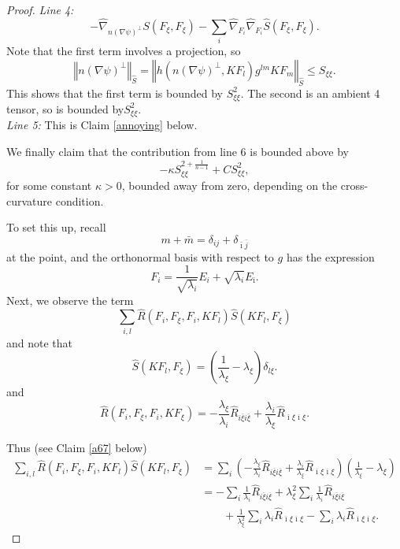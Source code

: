 \documentclass[10pt,a4paper]{amsart}
\newcommand{\maxidx}{\mathord{\xi}} %
\begin{document}
\begin{proof}
\textit{Line 4:}
\[
-\hat{\nabla}_{n\left(  \nabla\psi\right)  ^{\perp}}
S(F_{\maxidx},F_{\maxidx})
-\sum_{i}\hat{\nabla}_{F_{i}}\hat{\nabla}_{F_{i}}\hat{S}(F_{\maxidx},F_{\maxidx}).
\]
Note that the first term involves a projection, so
\[
\left\Vert n\left(  \nabla\psi\right)  ^{\perp}\right\Vert _{\hat{S}}
=\left\Vert
h(n\left(  \nabla\psi\right)  ^{\perp},KF_{l})g^{lm}KF_{m}\right\Vert_{\hat{S}} 
\leq S_{\maxidx\maxidx}.
\]
This shows that the first term is bounded by $S_{\maxidx\maxidx}^{2}.$ 
The second is an ambient 4 tensor, so is bounded by$S_{\maxidx\maxidx}^{2}.$\\

\textit{Line 5:} This is Claim \ref{annoying} below.

We finally claim that the contribution from line 6 is bounded above by
\[
-\kappa S_{\maxidx\maxidx}^{2+\frac{1}{n-1}} + C S_{\maxidx\maxidx}^{2},
\]
for some constant $\kappa>0$, bounded away from zero, 
depending on the cross-curvature condition.

To set this up, recall
\[
m+\bar{m}=\delta_{ij}+\delta_{\bar{\imath}
\bar{j}}
\]
at the point, and the orthonormal basis with respect to $g$ has the
expression
\[
F_i=\frac{1}{\sqrt{\lambda_{i}}}E_{i}
  +\sqrt{\lambda_{i}}E_{\bar{\imath}}.
\]
Next, we observe the term
\[
\sum_{i,l}\hat{R}(F_{i},F_{\maxidx},F_{i},KF_{l})\hat{S}(KF_{l},F_{\maxidx})
\]
and note that
\[
\hat{S}(KF_{l},F_{\maxidx})
=\left(  \frac{1}{\lambda_{\maxidx}}-\lambda_{\maxidx}\right)\delta_{l\maxidx}.
\]
and 
\[
\hat{R}(F_{i},F_{\maxidx},F_{i},KF_{\maxidx})
=-\frac{\lambda_{\maxidx}}{\lambda_{i}}\hat{R}_{i\overline{\maxidx} i\overline{\maxidx}}
+\frac{\lambda_{i}}{\lambda_{\maxidx}}\hat{R}_{\overline{\imath}\maxidx\overline{\imath}\maxidx}.
\]

Thus (see Claim \ref{a67} below) 
\begin{align*}
\sum_{i,l}\hat{R}(F_{i},F_{\maxidx},F_{i},KF_{l})\hat{S}(KF_{l},F_{\maxidx})
&=\sum_{i}\left(
  -\frac{\lambda_{\maxidx}}{\lambda_{i}}\hat{R}_{i\overline{\maxidx}i\overline{\maxidx}}
  +\frac{\lambda_{i}}{\lambda_{\maxidx}}\hat{R}_{\overline{\imath}\maxidx\overline{\imath}\maxidx}
\right)
\left(  \frac{1}{\lambda_{\maxidx}}-\lambda_{\maxidx}\right)  \\
&=-\sum_{i}\frac{1}{\lambda_{i}}\hat{R}_{i\overline{\maxidx}i\overline{\maxidx}}
  +\lambda_{\maxidx}^{2}\sum_{i}\frac{1}{\lambda_{i}}\hat{R}_{i\overline{\maxidx}i\overline{\maxidx}}\\
&\qquad+\frac{1}{\lambda_{\maxidx}^{2}}\sum_{i}\lambda_{i}\hat{R}_{\overline{\imath}%
\maxidx\overline{\imath}\maxidx}-\sum_{i}\lambda_{i}\hat{R}_{\overline{\imath}\maxidx\overline{\imath}\maxidx}.
\end{align*}


\end{proof}
\end{document}
